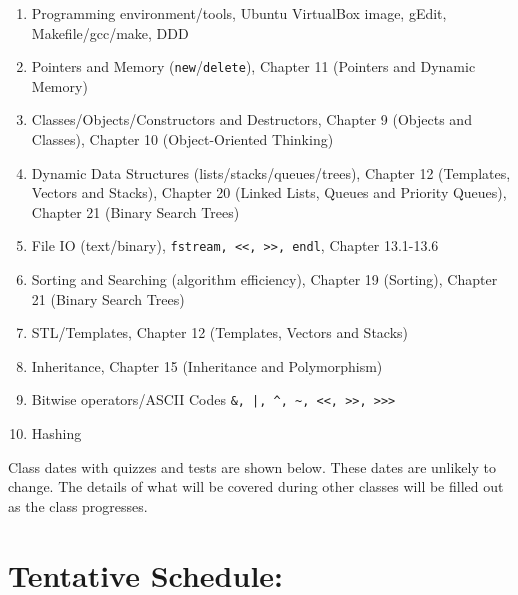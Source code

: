 \documentclass[11pt]{article}
\begin{document}
\begin{enumerate}
\item Programming environment/tools, Ubuntu VirtualBox image, gEdit, Makefile/gcc/make, DDD
\item Pointers and Memory (\lstinline$new$/\lstinline$delete$),
  Chapter 11 (Pointers and Dynamic Memory)
\item Classes/Objects/Constructors and Destructors, Chapter 9 (Objects
  and Classes), Chapter 10 (Object-Oriented Thinking)
\item Dynamic Data Structures (lists/stacks/queues/trees), Chapter 12
  (Templates, Vectors and Stacks), Chapter 20 (Linked Lists, Queues
  and Priority Queues), Chapter 21 (Binary Search Trees)
\item File IO (text/binary), \lstinline$fstream, <<, >>, endl$, Chapter 13.1-13.6
\item Sorting and Searching (algorithm efficiency), Chapter 19
  (Sorting), Chapter 21 (Binary Search Trees)
\item STL/Templates, Chapter 12 (Templates, Vectors and Stacks)
\item Inheritance, Chapter 15 (Inheritance and Polymorphism)
\item Bitwise operators/ASCII Codes \lstinline$&, |, ^, ~, <<, >>, >>>$
\item Hashing
\end{enumerate}

Class dates with quizzes and tests are shown below.  These dates are
unlikely to change.  The details of what will be covered during other
classes will be filled out as the class progresses.


\section*{Tentative Schedule:}
\label{sec:sched}
\end{document}
